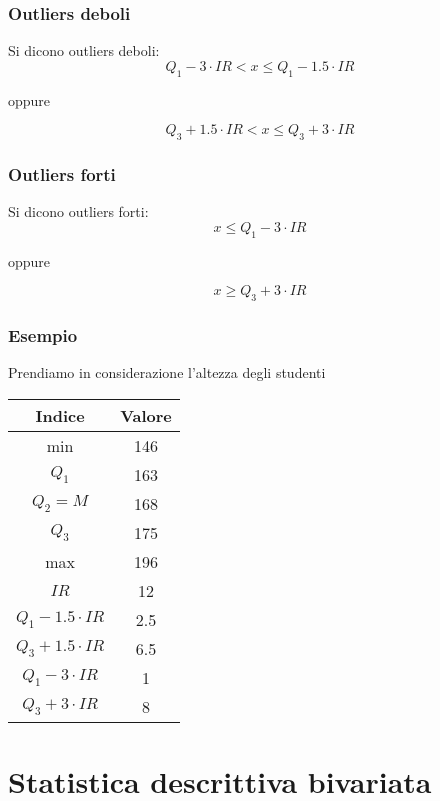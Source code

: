 \documentclass[a4paper]{article}
\theoremstyle{break}
\theoremstyle{break}
\theoremstyle{break}
\theoremstyle{break}
\begin{document}
\subsubsection{Outliers deboli}
Si dicono outliers deboli:
\[
	Q_1 - 3 \cdot IR < x \le Q_1 - 1.5 \cdot IR
\]
\begin{center}
	oppure
\end{center}
\[
	Q_3 + 1.5 \cdot IR < x \le Q_3 + 3 \cdot IR
\]

\subsubsection{Outliers forti}
Si dicono outliers forti:
\[
	x \le Q_1 - 3 \cdot IR
\]
\begin{center}
	oppure
\end{center}
\[
	x \ge Q_3 + 3 \cdot IR
\]
\subsubsection{Esempio}
Prendiamo in considerazione l'altezza degli studenti
\begin{table}[H]
	\centering
	\begin{tabular}{|c|c|}
		\hline
		Indice                   & Valore \\
		\hline
		min                      & 146    \\
		\( Q_1 \)                & 163    \\
		\( Q_2 = M \)            & 168    \\
		\( Q_3 \)                & 175    \\
		max                      & 196    \\
		\( IR \)                 & 12     \\
		\( Q_1 - 1.5 \cdot IR \) & 2.5    \\
		\( Q_3 + 1.5 \cdot IR \) & 6.5    \\
		\( Q_1 - 3 \cdot IR \)   & 1      \\
		\( Q_3 + 3 \cdot IR \)   & 8      \\
		\hline
	\end{tabular}
\end{table}
\label{D2}

\section{Statistica descrittiva bivariata}
\end{document}
